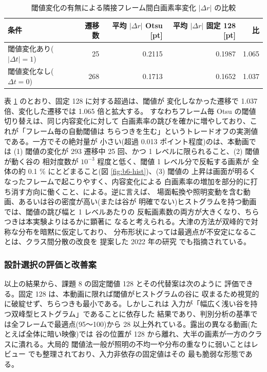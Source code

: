 \begin{table}[htbp]
\centering
\caption{閾値変化の有無による隣接フレーム間白画素率変化 $|\Delta r|$ の比較}
\label{tab:b6-flicker}
\begin{tabular}{lrrrr}
\hline
条件 & 遷移数 & 平均 $|\Delta r|$ Otsu [pt] & 平均 $|\Delta r|$ 固定 128 [pt] & 比 \\
\hline
閾値変化あり($|\Delta t| = 1$) & 25 & 0.2115 & 0.1987 & 1.065 \\
閾値変化なし($\Delta t = 0$) & 268 & 0.1713 & 0.1652 & 1.037 \\
\hline
\end{tabular}
\end{table}

表 \ref{tab:b6-flicker} のとおり、固定 128 に対する超過は、閾値が
変化しなかった遷移で 1.037 倍、変化した遷移では 1.065 倍と拡大する。
すなわちフレーム毎 Otsu の閾値切り替えは、同じ内容変化に対して
白画素率の跳びを確かに増やしており、これが「フレーム毎の自動閾値は
ちらつきを生む」というトレードオフの実測値である。一方でその絶対量が
小さい(超過 0.013 ポイント程度)のは、本動画では (1) 閾値の変化が
293 遷移中 25 回、かつ 1 レベルに限られること、(2) 閾値が動く谷の
相対度数が $10^{-3}$ 程度と低く、閾値 1 レベル分で反転する画素が
全体の約 0.1 \% にとどまること(図 \ref{fig:b6-hist})、(3) 閾値の
上昇は画面が明るくなったフレームで起こりやすく、内容変化による
白画素率の増加を部分的に打ち消す方向に働くこと、による。逆に言えば、
場面転換や照明変動を含む動画、あるいは谷の密度が高い(または谷が
明確でない)ヒストグラムを持つ動画では、閾値の跳び幅と 1 レベルあたりの
反転画素数の両方が大きくなり、ちらつきは本実験よりはるかに顕著に
なると考えられる。大津の方法が双峰的で対称な分布を暗黙に仮定しており、
分布形状によっては最適点が不安定になることは、クラス間分散の改良を
提案した 2022 年の研究 \cite{b6-lognormal} でも指摘されている。

\subsubsection{設計選択の評価と改善案}

以上の結果から、課題 8 の固定閾値 128 とその代替案は次のように
評価できる。固定 128 は、本動画に限れば閾値がヒストグラムの谷に
収まるため視覚的に破綻せず、ちらつきも最小である。しかしこれは
入力が「幅広く浅い谷を持つ双峰型ヒストグラム」であることに依存した
結果であり、判別分析の基準では全フレームで最適点(95〜100)から
28 以上外れている。露出の異なる動画(たとえば全体に暗い映像)では
谷の位置が 128 から離れ、大半の画素が一方のクラスに潰れる。大局的
閾値法一般が照明の不均一や分布の重なりに弱いことはレビュー
\cite{b6-binreview} でも整理されており、入力非依存の固定値はその
最も脆弱な形態である。

